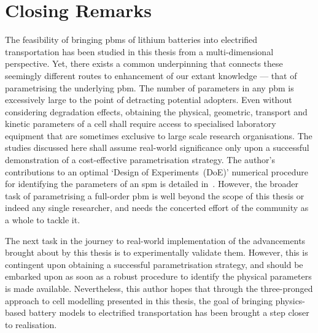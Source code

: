 \section{Closing Remarks}

The feasibility of bringing \glspl{pbm} of lithium batteries into electrified
transportation has been studied in this thesis from a multi-dimensional
perspective. Yet, there exists a common underpinning that connects these
seemingly different routes to enhancement of our extant knowledge --- that of
parametrising the underlying \gls{pbm}. The number of parameters in any
\gls{pbm} is excessively large to the point of detracting potential adopters.
Even without considering degradation effects, obtaining the physical, geometric,
transport and kinetic parameters of a cell shall require access to specialised
laboratory equipment that are sometimes exclusive to large scale research
organisations. The studies discussed here shall assume real-world significance
only upon a successful demonstration of a cost-effective parametrisation
strategy. The author's contributions to an optimal `Design of Experiments~(DoE)'
numerical procedure for identifying the parameters of an \gls{spm} is detailed
in~\cite{Pozzi2018}. However, the broader task of parametrising a
full-order \gls{pbm} is well beyond the scope of this thesis or indeed any
single researcher, and needs the concerted effort of the community as a whole to
tackle it.

The next task in the journey to real-world implementation of the advancements
brought about by this thesis is to  experimentally validate them. However, this
is contingent upon obtaining a successful parametrisation strategy, and should
be embarked upon as soon as a robust procedure to identify the physical
parameters is made available. Nevertheless, this author hopes that through the
three-pronged approach to cell modelling presented in this thesis, the goal of
bringing physics-based battery models to electrified transportation has been
brought a step closer to realisation.

\backmatter
\singlespacing
\begin{footnotesize} %
    \renewcommand{\bibname}{References} %
    \cleardoublepage
    \addcontentsline{toc}{chapter}{\bibname}
    \printbibliography
\end{footnotesize}

\makeatletter
\@mainmattertrue
\makeatother
\cleardoublepage

